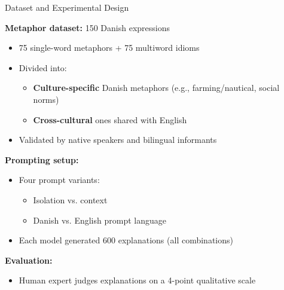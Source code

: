 \documentclass[dvipsnames]{beamer}
\begin{document}
\begin{frame}{Dataset and Experimental Design}

  \textbf{Metaphor dataset:} 150 Danish expressions
  \begin{itemize}
  \item 75 single-word metaphors + 75 multiword idioms 
  \item Divided into:
    \begin{itemize}
    \item \textbf{Culture-specific} Danish metaphors (e.g., farming/nautical, social norms)
    \item \textbf{Cross-cultural} ones shared with English
    \end{itemize}
  \item Validated by native speakers and bilingual informants
  \end{itemize}

\medskip
\textbf{Prompting setup:}
\begin{itemize}
\item Four prompt variants:
  \begin{itemize}
  \item Isolation vs. context
  \item Danish vs. English prompt language
  \end{itemize}
\item Each model generated 600 explanations (all combinations)
\end{itemize}

\medskip
\textbf{Evaluation:}
\begin{itemize}
  \item Human expert judges explanations on a 4-point qualitative scale
\end{itemize}

\end{frame}
\end{document}
